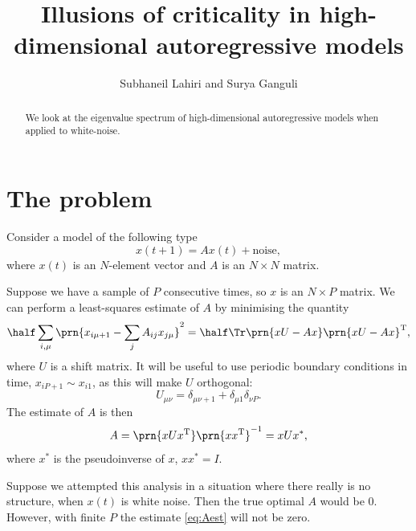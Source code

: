 \documentclass[12pt]{article}
\title{Illusions of criticality in high-dimensional autoregressive models}
\author{Subhaneil Lahiri and Surya Ganguli
%
}
\newcommand{\inv}{^{-1}}
\newcommand{\trans}{^\mathrm{T}}
\begin{document}
\maketitle




\begin{abstract}
  We look at the eigenvalue spectrum of high-dimensional autoregressive models when applied to white-noise.
\end{abstract}

\tableofcontents


\section{The problem}\label{sec:theprob}

Consider a model of the following type
%
\begin{equation}\label{eq:model}
  x(t+1) = A x(t) + \text{noise},
\end{equation}
%
where $x(t)$ is an $N$-element vector and $A$ is an $N\times N$ matrix.

Suppose we have a sample of $P$ consecutive times, so $x$ is an $N\times P$ matrix.
We can perform a least-squares estimate of $A$ by minimising the quantity
%
\begin{equation}\label{eq:minL}
  \half\sum_{i,\mu} \prn{ x_{i\mu+1} - \sum_j A_{ij} x_{j\mu} }^2 = \half\Tr \prn{xU-Ax}\prn{xU-Ax}\trans,
\end{equation}
%
where $U$ is a shift matrix.
It will be useful to use periodic boundary conditions in time, \ie $x_{iP+1}\sim x_{i1}$,
as this will make $U$ orthogonal:
%
\begin{equation}\label{eq:Udef}
  U_{\mu\nu} = \delta_{\mu\nu+1} + \delta_{\mu1}\delta_{\nu P}.
\end{equation}
%
The estimate of $A$ is then
%
\begin{equation}\label{eq:Aest}
  A = \prn{xUx\trans}\prn{xx\trans}\inv = xUx^*,
\end{equation}
%
where $x^*$ is the pseudoinverse of $x$, \ie $xx^*=I$.

Suppose we attempted this analysis in a situation where there really is no structure,
\ie when $x(t)$ is white noise.
Then the true optimal $A$ would be 0.
However, with finite $P$ the estimate \eqref{eq:Aest} will not be zero.
\end{document}
